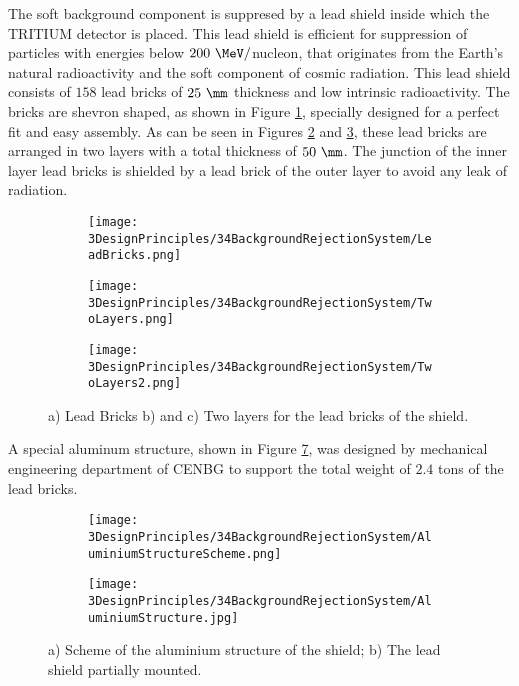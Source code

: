 The soft background component is suppresed by a lead shield inside which the TRITIUM detector is placed. This lead shield is efficient for suppression of particles with energies below $200~\MeV/$nucleon, that originates from the Earth's natural radioactivity and the soft component of cosmic radiation. This lead shield consists of $158$ lead bricks of $25~\mm$ thickness and low intrinsic radioactivity. The bricks are shevron shaped, as shown in Figure \ref{subfig:LeadBricks}, specially designed for a perfect fit and easy assembly. As can be seen in Figures \ref{subfig:TwoLayers} and \ref{subfig:TwoLayers2}, these lead bricks are arranged in two layers with a total thickness of $50~\mm$. The junction of the inner layer lead bricks is shielded by a lead brick of the outer layer to avoid any leak of radiation.

\begin{figure}[h]
\centering
    \begin{subfigure}[b]{0.3\textwidth}
    \centering
    \texttt{[image: 3DesignPrinciples/34BackgroundRejectionSystem/LeadBricks.png]}  
    \caption{\label{subfig:LeadBricks}}
    \end{subfigure}
    \hfill
    \begin{subfigure}[b]{0.3\textwidth}
    \centering
    \texttt{[image: 3DesignPrinciples/34BackgroundRejectionSystem/TwoLayers.png]}  
    \caption{\label{subfig:TwoLayers}}
    \end{subfigure}
    \hfill
    \begin{subfigure}[b]{0.3\textwidth}
    \centering
    \texttt{[image: 3DesignPrinciples/34BackgroundRejectionSystem/TwoLayers2.png]}  
    \caption{\label{subfig:TwoLayers2}}
    \end{subfigure}
 \caption{a) Lead Bricks b) and c) Two layers for the lead bricks of the shield.}
 \label{fig:LeadBricksAndArrangement}
\end{figure}

A special aluminum structure, shown in Figure \ref{fig:AluminiumStructure}, was designed by mechanical engineering department of CENBG to support the total weight of $2.4$ tons of the lead bricks.

\begin{figure}
\centering
    \begin{subfigure}[b]{0.45\textwidth}
    \centering
    \texttt{[image: 3DesignPrinciples/34BackgroundRejectionSystem/AluminiumStructureScheme.png]}  
    \caption{\label{subfig:AluminiumStructureScheme}}
    \end{subfigure}
    \hfill
    \begin{subfigure}[b]{0.4\textwidth}
    \centering
    \texttt{[image: 3DesignPrinciples/34BackgroundRejectionSystem/AluminiumStructure.jpg]}  
    \caption{\label{subfig:AluminiumStructure}}
    \end{subfigure}
    \caption{a) Scheme of the aluminium structure of the shield; b) The lead shield partially mounted.}
 \label{fig:AluminiumStructure}
\end{figure}

